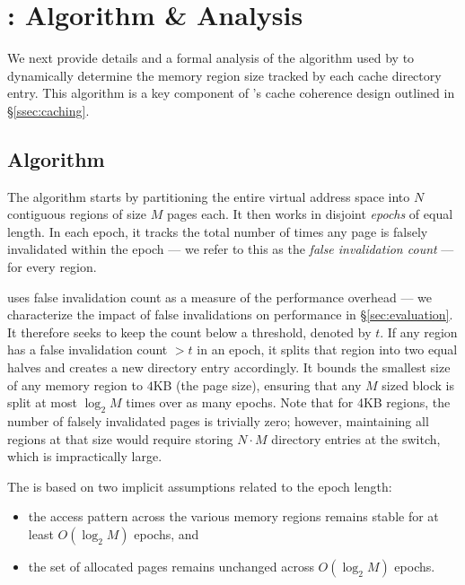 
\section{\mindAlgo: Algorithm \& Analysis}
\label{sec:algorithm}

We next provide details and a formal analysis of the \mindalgo algorithm used by \mind to dynamically determine the memory region size tracked by each cache directory entry.  This algorithm is a key component of \mind's cache coherence design outlined in \S\ref{ssec:caching}.

\subsection{Algorithm}
\label{ssec:detail}

The \mindalgo algorithm starts by partitioning the entire virtual address space into $N$ contiguous regions of size $M$ pages each. It then works in disjoint \emph{epochs} of equal length. In each epoch, it tracks the total number of times any page is falsely invalidated within the epoch  --- we refer to this as the \textit{false invalidation count} --- for every region.

\mindAlgo uses false invalidation count as a measure of the performance overhead --- we characterize the impact of false invalidations on performance in \S\ref{sec:evaluation}. It therefore seeks to keep the count below a threshold, denoted by $t$. 
If any region has a false invalidation count $> t$ in an epoch, it splits that region into two equal halves and creates a new directory entry accordingly. It bounds the smallest size of any memory region to $4$KB (the page size), ensuring that any $M$ sized block is split at most $\log_2{M}$ times over as many epochs. Note that for 4KB regions, the number of falsely invalidated pages is trivially zero; however, maintaining all regions at that size would require storing $N\cdot M$ directory entries at the switch, which is impractically large. 


 The \mindalgo is based on two implicit assumptions related to the epoch length:
\begin{itemize}[itemsep=0pt, leftmargin=*]
  \item the access pattern across the various memory regions remains stable for at least $O(\log_2{M})$ epochs, and
  \item the set of allocated pages remains unchanged across $O(\log_2{M})$ epochs.
\end{itemize}

